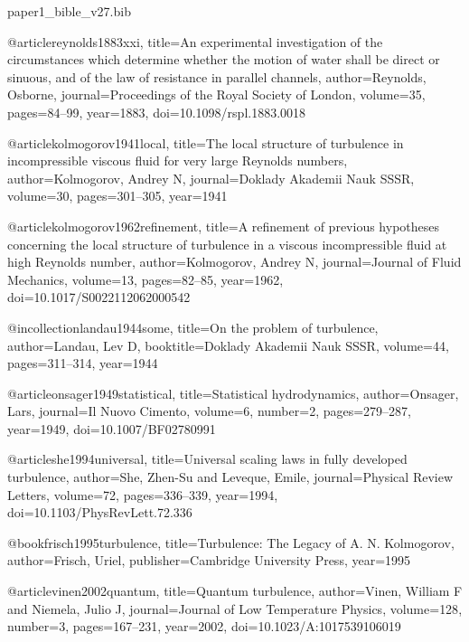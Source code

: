 
\begin{filecontents}[overwrite]{paper1_bible_v27.bib}

@article{reynolds1883xxi,
  title={An experimental investigation of the circumstances which determine whether the motion of water shall be direct or sinuous, and of the law of resistance in parallel channels},
  author={Reynolds, Osborne},
  journal={Proceedings of the Royal Society of London},
  volume={35},
  pages={84--99},
  year={1883},
  doi={10.1098/rspl.1883.0018}
}

@article{kolmogorov1941local,
  title={The local structure of turbulence in incompressible viscous fluid for very large Reynolds numbers},
  author={Kolmogorov, Andrey N},
  journal={Doklady Akademii Nauk SSSR},
  volume={30},
  pages={301--305},
  year={1941}
}

@article{kolmogorov1962refinement,
  title={A refinement of previous hypotheses concerning the local structure of turbulence in a viscous incompressible fluid at high Reynolds number},
  author={Kolmogorov, Andrey N},
  journal={Journal of Fluid Mechanics},
  volume={13},
  pages={82--85},
  year={1962},
  doi={10.1017/S0022112062000542}
}

@incollection{landau1944some,
  title={On the problem of turbulence},
  author={Landau, Lev D},
  booktitle={Doklady Akademii Nauk SSSR},
  volume={44},
  pages={311--314},
  year={1944}
}

@article{onsager1949statistical,
  title={Statistical hydrodynamics},
  author={Onsager, Lars},
  journal={Il Nuovo Cimento},
  volume={6},
  number={2},
  pages={279--287},
  year={1949},
  doi={10.1007/BF02780991}
}

@article{she1994universal,
  title={Universal scaling laws in fully developed turbulence},
  author={She, Zhen-Su and Leveque, Emile},
  journal={Physical Review Letters},
  volume={72},
  pages={336--339},
  year={1994},
  doi={10.1103/PhysRevLett.72.336}
}

@book{frisch1995turbulence,
  title={Turbulence: The Legacy of A. N. Kolmogorov},
  author={Frisch, Uriel},
  publisher={Cambridge University Press},
  year={1995}
}

@article{vinen2002quantum,
  title={Quantum turbulence},
  author={Vinen, William F and Niemela, Julio J},
  journal={Journal of Low Temperature Physics},
  volume={128},
  number={3},
  pages={167--231},
  year={2002},
  doi={10.1023/A:1017539106019}
}


\end{filecontents}
